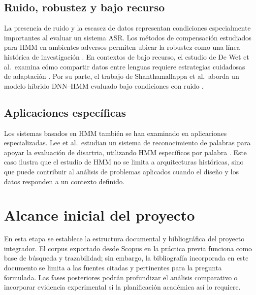 \documentclass[12pt,a4paper]{article}
\begin{document}
\subsection{Ruido, robustez y bajo recurso}

La presencia de ruido y la escasez de datos representan condiciones especialmente importantes al evaluar un sistema ASR. Los métodos de compensación estudiados para HMM en ambientes adversos permiten ubicar la robustez como una línea histórica de investigación \cite{Vaseghi1997}. En contextos de bajo recurso, el estudio de De Wet et al.\ examina cómo compartir datos entre lenguas requiere estrategias cuidadosas de adaptación \cite{DeWet2017}. Por su parte, el trabajo de Shanthamallappa et al.\ aborda un modelo híbrido DNN--HMM evaluado bajo condiciones con ruido \cite{Shanthamallappa2026}.

\subsection{Aplicaciones específicas}

Los sistemas basados en HMM también se han examinado en aplicaciones especializadas. Lee et al.\ estudian un sistema de reconocimiento de palabras para apoyar la evaluación de disartria, utilizando HMM específicos por palabra \cite{Lee2019}. Este caso ilustra que el estudio de HMM no se limita a arquitecturas históricas, sino que puede contribuir al análisis de problemas aplicados cuando el diseño y los datos responden a un contexto definido.

\section{Alcance inicial del proyecto}

En esta etapa se establece la estructura documental y bibliográfica del proyecto integrador. El corpus exportado desde Scopus en la práctica previa funciona como base de búsqueda y trazabilidad; sin embargo, la bibliografía incorporada en este documento se limita a las fuentes citadas y pertinentes para la pregunta formulada. Las fases posteriores podrán profundizar el análisis comparativo o incorporar evidencia experimental si la planificación académica así lo requiere.

\printbibliography[heading=bibintoc,title={Referencias}]
\end{document}
